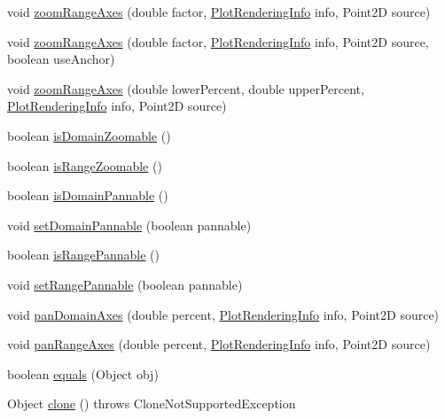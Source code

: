 \begin{DoxyCompactItemize}
void \mbox{\hyperlink{classorg_1_1jfree_1_1chart_1_1plot_1_1_fast_scatter_plot_aa0775f98292f2aa721aac27a2a5b8cac}{zoom\+Range\+Axes}} (double factor, \mbox{\hyperlink{classorg_1_1jfree_1_1chart_1_1plot_1_1_plot_rendering_info}{Plot\+Rendering\+Info}} info, Point2D source)
\item 
void \mbox{\hyperlink{classorg_1_1jfree_1_1chart_1_1plot_1_1_fast_scatter_plot_a08ca81e03a7066d972eb3d92ddb5697e}{zoom\+Range\+Axes}} (double factor, \mbox{\hyperlink{classorg_1_1jfree_1_1chart_1_1plot_1_1_plot_rendering_info}{Plot\+Rendering\+Info}} info, Point2D source, boolean use\+Anchor)
\item 
void \mbox{\hyperlink{classorg_1_1jfree_1_1chart_1_1plot_1_1_fast_scatter_plot_a057819db1adfa16561ac35f9b978e045}{zoom\+Range\+Axes}} (double lower\+Percent, double upper\+Percent, \mbox{\hyperlink{classorg_1_1jfree_1_1chart_1_1plot_1_1_plot_rendering_info}{Plot\+Rendering\+Info}} info, Point2D source)
\item 
boolean \mbox{\hyperlink{classorg_1_1jfree_1_1chart_1_1plot_1_1_fast_scatter_plot_ad76e90758ec2f53171f72cba288621a4}{is\+Domain\+Zoomable}} ()
\item 
boolean \mbox{\hyperlink{classorg_1_1jfree_1_1chart_1_1plot_1_1_fast_scatter_plot_a3508600766d21adb9a8aa2a8fe121d71}{is\+Range\+Zoomable}} ()
\item 
boolean \mbox{\hyperlink{classorg_1_1jfree_1_1chart_1_1plot_1_1_fast_scatter_plot_af6289348bf124d368a03a593443a53e4}{is\+Domain\+Pannable}} ()
\item 
void \mbox{\hyperlink{classorg_1_1jfree_1_1chart_1_1plot_1_1_fast_scatter_plot_aeb43d9a8a2df5a58a4fd45a560cf525e}{set\+Domain\+Pannable}} (boolean pannable)
\item 
boolean \mbox{\hyperlink{classorg_1_1jfree_1_1chart_1_1plot_1_1_fast_scatter_plot_a3a191cded96725f3dfe473c288d96e91}{is\+Range\+Pannable}} ()
\item 
void \mbox{\hyperlink{classorg_1_1jfree_1_1chart_1_1plot_1_1_fast_scatter_plot_a102e895df237168d931eea1cb47e3f4b}{set\+Range\+Pannable}} (boolean pannable)
\item 
void \mbox{\hyperlink{classorg_1_1jfree_1_1chart_1_1plot_1_1_fast_scatter_plot_a7b79099368e18d05d90d7d876094690e}{pan\+Domain\+Axes}} (double percent, \mbox{\hyperlink{classorg_1_1jfree_1_1chart_1_1plot_1_1_plot_rendering_info}{Plot\+Rendering\+Info}} info, Point2D source)
\item 
void \mbox{\hyperlink{classorg_1_1jfree_1_1chart_1_1plot_1_1_fast_scatter_plot_a0dc3b2637c3e4ebed3e4fe5902b90407}{pan\+Range\+Axes}} (double percent, \mbox{\hyperlink{classorg_1_1jfree_1_1chart_1_1plot_1_1_plot_rendering_info}{Plot\+Rendering\+Info}} info, Point2D source)
\item 
boolean \mbox{\hyperlink{classorg_1_1jfree_1_1chart_1_1plot_1_1_fast_scatter_plot_aca293c5a493be4ff6f80b393b5b19b1e}{equals}} (Object obj)
\item 
Object \mbox{\hyperlink{classorg_1_1jfree_1_1chart_1_1plot_1_1_fast_scatter_plot_a97ac5bdd911af1c2b2ffd5d95f44ee66}{clone}} ()  throws Clone\+Not\+Supported\+Exception 
\end{DoxyCompactItemize}
